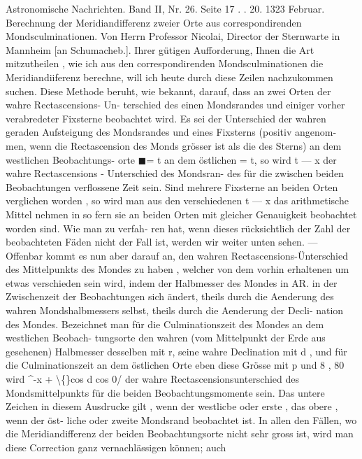 \documentclass[10pt,a4paper]{article}
\begin{document}
Astronomische  Nachrichten.     Band  II,  Nr.  26.  Seite  17 . .  20.     1323  Februar.
Berechnung  der  Meridiandifferenz  zweier  Orte  aus  correspondirenden  Mondsculminationen.
Von  Herrn  Professor  Nicolai,  Director  der  Sternwarte  in  Mannheim  [an  Schumacheb.].
Ihrer  gütigen  Aufforderung,  Ihnen  die  Art  mitzutheilen ,  wie  ich  aus  den  correspondirenden
Mondsculminationen  die  Meridiandiiferenz  berechne,  will  ich  heute  durch  diese  Zeilen  nachzukommen
suchen.
Diese  Methode  beruht,  wie  bekannt,  darauf,  dass  an  zwei  Orten  der  wahre  Rectascensions- Un-
terschied des  einen  Mondsrandes  und  einiger  vorher  verabredeter  Fixsterne  beobachtet  wird.  Es  sei  der
Unterschied  der  wahren  geraden  Aufsteigung  des  Mondsrandes  und  eines  Fixsterns  (positiv  angenom-
men, wenn  die  Rectascension  des  Monds  grösser  ist  als  die  des  Sterns)  an  dem  westlichen  Beobachtungs-
orte \ensuremath{\blacksquare}=  t  an  dem  östlichen  =  t,  so  wird  t  ---  x  der  wahre  Rectascensions  -  Unterschied  des  Mondsran-
des für  die  zwischen  beiden  Beobachtungen  verflossene  Zeit  sein.  Sind  mehrere  Fixsterne  an  beiden
Orten  verglichen  worden ,  so  wird  man  aus  den  verschiedenen  t  ---  x  das  arithmetische  Mittel  nehmen
in  so  fern  sie  an  beiden  Orten  mit  gleicher  Genauigkeit  beobachtet  worden  sind.  Wie  man  zu  verfah-
ren hat,  wenn  dieses  rücksichtlich  der  Zahl  der  beobachteten  Fäden  nicht  der  Fall  ist,  werden  wir
weiter  unten  sehen.  ---  Offenbar  kommt  es  nun  aber  darauf  an,  den  wahren  Rectascensions-Ünterschied
des  Mittelpunkts  des  Mondes  zu  haben ,  welcher  von  dem  vorhin  erhaltenen  um  etwas  verschieden  sein
wird,  indem  der  Halbmesser  des  Mondes  in  AR.  in  der  Zwischenzeit  der  Beobachtungen  sich  ändert,
theils  durch  die  Aenderung  des  wahren  Mondshalbmessers  selbst,  theils  durch  die  Aenderung  der  Decli-
nation  des  Mondes.  Bezeichnet  man  für  die  Culminationszeit  des  Mondes  an  dem  westlichen  Beobach-
tungsorte den  wahren  (vom  Mittelpunkt  der  Erde  aus  gesehenen)  Halbmesser  desselben  mit  r,  seine
wahre  Declination  mit  d ,  und  für  die  Culminationszeit  an  dem  östlichen  Orte  eben  diese  Grösse  mit  p
und    8 ,    80  wird
\textasciicircum{}-x  +
\textbackslash\{\}cos  d      cos  0/
der  wahre  Rectascensionsunterschied  des  Mondsmittelpunkts  für  die  beiden  Beobachtungsmomente  sein.
Das  untere  Zeichen  in  diesem  Ausdrucke  gilt ,  wenn  der  westlicbe  oder  erste ,  das  obere ,  wenn  der  öst-
liche oder  zweite  Mondsrand  beobachtet  ist.  In  allen  den  Fällen,  wo  die  Meridiandifferenz  der  beiden
Beobachtungsorte  nicht  sehr  gross  ist,   wird  man   diese  Correction   ganz   vernachlässigen   können;   auch
\end{document}

